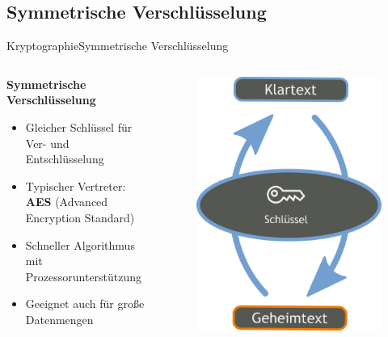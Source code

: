 \documentclass[10pt]{beamer}
\begin{document}
\subsection{Symmetrische Verschlüsselung}
\begin{frame}{Kryptographie}{Symmetrische Verschlüsselung}
	\begin{columns}
		\begin{column}{6cm}
			\textbf{Symmetrische Verschlüsselung}
			\begin{itemize}
				\item Gleicher Schlüssel für Ver- und Entschlüsselung
				\item Typischer Vertreter: \textbf{AES} (Advanced Encryption Standard)
				\item Schneller Algorithmus mit Prozessorunterstützung
				\item Geeignet auch für große Datenmengen
			\end{itemize}
		\end{column}
		\begin{column}{5cm}
			\begin{figure}[p]
				\centering
				\includegraphics[scale=0.25]{SymKrypto.png}

\end{figure}
\end{column}
\end{columns}
\end{frame}
\end{document}
